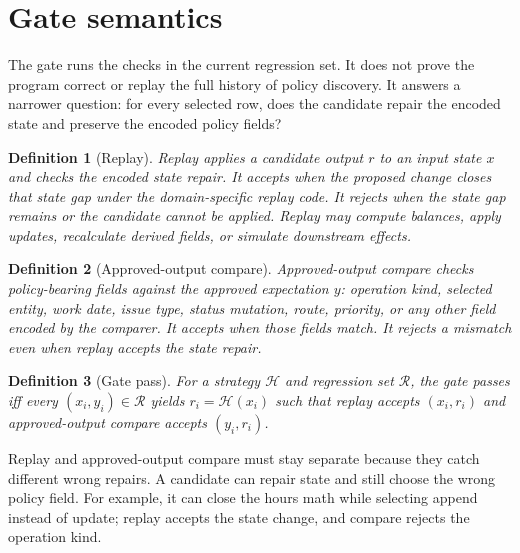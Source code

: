 \documentclass[11pt]{article}
\newtheorem{definition}{Definition}
\newcommand{\regression}{\mathcal{R}}
\newcommand{\strategy}{\mathcal{H}}
\begin{document}
\section{Gate semantics}
\label{sec:gate-semantics}

The gate runs the checks in the current regression set.  It does not prove the program correct
or replay the full history of policy discovery.  It answers a narrower question: for every
selected row, does the candidate repair the encoded state and preserve the encoded policy
fields?

\begin{definition}[Replay]
Replay applies a candidate output $r$ to an input state $x$ and checks the encoded state
repair.  It accepts when the proposed change closes that state gap under the domain-specific
replay code.  It rejects when the state gap remains or the candidate cannot be applied.  Replay
may compute balances, apply updates, recalculate derived fields, or simulate downstream effects.
\end{definition}

\begin{definition}[Approved-output compare]
Approved-output compare checks policy-bearing fields against the approved expectation $y$: operation
kind, selected entity, work date, issue type, status mutation, route, priority, or any other
field encoded by the comparer.  It accepts when those fields match.  It rejects a mismatch even
when replay accepts the state repair.
\end{definition}

\begin{definition}[Gate pass]
For a strategy $\strategy$ and regression set $\regression$, the gate passes iff every
$(x_i, y_i) \in \regression$ yields $r_i = \strategy(x_i)$ such that replay accepts $(x_i, r_i)$
and approved-output compare accepts $(y_i, r_i)$.
\end{definition}

Replay and approved-output compare must stay separate because they catch different wrong repairs.  A candidate
can repair state and still choose the wrong policy field.  For example, it can close the hours
math while selecting append instead of update; replay accepts the state change, and compare
rejects the operation kind.
\end{document}
